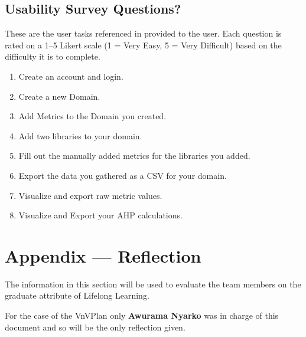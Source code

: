 \documentclass[12pt, titlepage]{article}
\begin{document}
\subsection{Usability Survey Questions?}
\label{sec:usability-survey}
These are the user tasks referenced in provided to the user. Each question is rated on a 1–5
Likert scale (1 = Very Easy, 5 = Very Difficult) based on the difficulty it is to complete.

\begin{enumerate}
  \item Create an account and login.
  \item Create a new Domain.
  \item Add Metrics to the Domain you created.
  \item Add two libraries to your domain.
  \item Fill out the manually added metrics for the libraries you added.
  \item Export the data you gathered as a CSV for your domain.
  \item Visualize and export raw metric values.
  \item Visualize and Export your AHP calculations.
\end{enumerate}
  \newpage{}
\section*{Appendix --- Reflection}

The information in this section will be used to evaluate the team members on the
graduate attribute of Lifelong Learning.




For the case of the VnVPlan only \textbf{Awurama Nyarko} was in charge of this document
and so will be the only reflection given.
\end{document}
